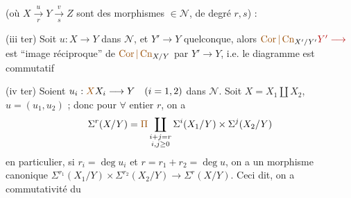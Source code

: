 (où $X\xrightarrow[r]{u}Y\xrightarrow[s]{v}Z$ sont des morphismes $\in\mathcal N$, de degré $r,s$) :

(iii ter) Soit $u:X\longrightarrow Y$ dans $\mathcal N$, et $Y'\longrightarrow Y$ quelconque, alors $\unsure{\operatorname{Cor}|\operatorname{Cn}}_{X'/Y'}\deleted{Y'\longrightarrow}$ est ``image réciproque'' de $\unsure{\operatorname{Cor}|\operatorname{Cn}}_{X/Y}$ par $Y'\longrightarrow Y$, i.e. le diagramme
est commutatif

(iv ter) Soient $u_i:\deleted{\unsure{X}}X_i\longrightarrow Y\quad(i=1,2)$ dans $\mathcal N$. Soit $X=X_1\amalg X_2$, $u=(u_1,u_2)$ ; donc pour $\forall$ entier $r$, on a
\[
\Sigma^r(X/Y)=\deleted{\unsure{\Pi}}\coprod_{\substack{i+j=r\\i,j\geq0}}\Sigma^i(X_1/Y)\times\Sigma^j(X_2/Y)
\]
en particulier, si $r_i=\deg u_i$ et $r=r_1+r_2=\deg u$, on a un morphisme  canonique $\Sigma^{r_1}(X_1/Y)\times\Sigma^{r_2}(X_2/Y)\longrightarrow\Sigma^r(X/Y)$. Ceci dit, on a commutativité du

